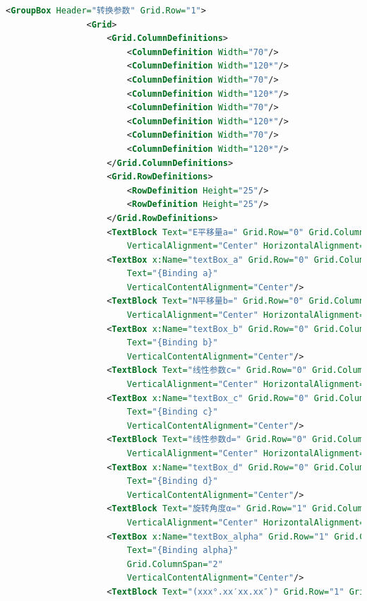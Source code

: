 \begin{lstlisting}[language=xml]
            <GroupBox Header="转换参数" Grid.Row="1">
                <Grid>
                    <Grid.ColumnDefinitions>
                        <ColumnDefinition Width="70"/>
                        <ColumnDefinition Width="120*"/>
                        <ColumnDefinition Width="70"/>
                        <ColumnDefinition Width="120*"/>
                        <ColumnDefinition Width="70"/>
                        <ColumnDefinition Width="120*"/>
                        <ColumnDefinition Width="70"/>
                        <ColumnDefinition Width="120*"/>
                    </Grid.ColumnDefinitions>
                    <Grid.RowDefinitions>
                        <RowDefinition Height="25"/>
                        <RowDefinition Height="25"/>
                    </Grid.RowDefinitions>
                    <TextBlock Text="E平移量a=" Grid.Row="0" Grid.Column="0" 
                        VerticalAlignment="Center" HorizontalAlignment="Right"/>
                    <TextBox x:Name="textBox_a" Grid.Row="0" Grid.Column="1" 
                        Text="{Binding a}" 
                        VerticalContentAlignment="Center"/>
                    <TextBlock Text="N平移量b=" Grid.Row="0" Grid.Column="2"  
                        VerticalAlignment="Center" HorizontalAlignment="Right"/>
                    <TextBox x:Name="textBox_b" Grid.Row="0" Grid.Column="3"  
                        Text="{Binding b}"
                        VerticalContentAlignment="Center"/>
                    <TextBlock Text="线性参数c=" Grid.Row="0" Grid.Column="4" 
                        VerticalAlignment="Center" HorizontalAlignment="Right"/>
                    <TextBox x:Name="textBox_c" Grid.Row="0" Grid.Column="5" 
                        Text="{Binding c}"
                        VerticalContentAlignment="Center"/>
                    <TextBlock Text="线性参数d=" Grid.Row="0" Grid.Column="6" 
                        VerticalAlignment="Center" HorizontalAlignment="Right"/>
                    <TextBox x:Name="textBox_d" Grid.Row="0" Grid.Column="7"  
                        Text="{Binding d}" 
                        VerticalContentAlignment="Center"/>
                    <TextBlock Text="旋转角度α=" Grid.Row="1" Grid.Column="0" 
                        VerticalAlignment="Center" HorizontalAlignment="Right"/>
                    <TextBox x:Name="textBox_alpha" Grid.Row="1" Grid.Column="1"  
                        Text="{Binding alpha}" 
                        Grid.ColumnSpan="2"
                        VerticalContentAlignment="Center"/>
                    <TextBlock Text="(xxx°.xx′xx.xx″)" Grid.Row="1" Grid.Column="3" 

\end{lstlisting}
